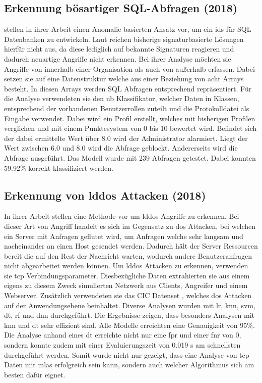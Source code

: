 \documentclass[
    12pt, %
    DIV10,
    ngerman, %
    a4paper, %
    oneside, %
    titlepage, %
    parskip=half, %
    headings=normal, %
    listof=totoc, %
    bibliography=totoc, %
    index=totoc, %
    captions=tableheading, %
    final %
]{scrreprt}
\begin{document}
\subsection{Erkennung bösartiger SQL-Abfragen (2018)}
\textcite{Jayaprakash2018} stellen in ihrer Arbeit einen Anomalie basierten Ansatz vor, um ein \ac{ids} für SQL Datenbanken zu entwickeln. Laut \textcite{Jayaprakash2018} reichen bisherige signaturbasierte Lösungen hierfür nicht aus, da diese lediglich auf bekannte Signaturen reagieren und dadurch neuartige Angriffe nicht erkennen. Bei ihrer Analyse möchten sie Angriffe von innerhalb einer Organisation als auch von au{\ss}erhalb erfassen. Dabei setzen sie auf eine Datenstruktur welche aus einer Beziehung von acht Arrays besteht. In diesen Arrays werden SQL Abfragen entsprechend repräsentiert. Für die Analyse verwendeten sie den \acl{nb} Klassifikator, welcher Daten in Klassen, entsprechend der vorhandenen Benutzerrollen zuteilt und die Protokolldatei als Eingabe verwendet. Dabei wird ein Profil erstellt, welches mit bisherigen Profilen verglichen und mit einem Punktesystem von 0 bis 10 bewertet wird. Befindet sich der dabei ermittelte Wert über 8.0 wird der Administrator alarmiert. Liegt der Wert zwischen 6.0 und 8.0 wird die Abfrage geblockt. Andererseits wird die Abfrage ausgeführt. Das Modell wurde mit 239 Abfragen getestet. Dabei konnten 59.92\% korrekt klassifiziert werden.
%
\subsection{Erkennung von \acs{lddos} Attacken (2018)}\label{cic}
In ihrer Arbeit stellen \textcite{siracusano2018detection} eine Methode vor um \ac{lddos} Angriffe zu erkennen. Bei dieser Art von Angriff handelt es sich im Gegensatz zu \ac{dos} Attacken, bei welchen ein Server mit Anfragen geflutet wird, um Anfragen welche sehr langsam und nacheinander an einen Host gesendet werden. Dadurch hält der Server Ressourcen bereit die auf den Rest der Nachricht warten, wodurch andere Benutzeranfragen nicht abgearbeitet werden können. Um \ac{lddos} Attacken zu erkennen, verwenden sie \ac{tcp} Verbindungsparameter. Diesbezügliche Daten extrahierten sie aus einem eigens zu diesem Zweck simulierten Netzwerk aus Clients, Angreifer und einem Webserver. Zusätzlich verwendeten sie das CIC Datenset \parencite{jazi2017detecting}, welches \ac{dos} Attacken auf der Anwendungsebene beinhaltet.
Diverse Analysen wurden mit \ac{lr}, \ac{knn}, \ac{svm}, \ac{dt}, \ac{rf} und \ac{dnn} durchgeführt. Die Ergebnisse zeigen, dass besonders Analysen mit \ac{knn} und \ac{dt} sehr effizient sind. Alle Modelle erreichten eine Genauigkeit von 95\%. Die Analyse anhand eines \acl{dt} erreichte nicht nur eine \ac{fpr} und einer \ac{fnr} von 0, sondern konnte zudem mit einer Evaluierungszeit von 0.019 s am schnellsten durchgeführt werden. Somit wurde nicht nur gezeigt, dass eine Analyse von \ac{tcp} Daten mit \ac{mlas} erfolgreich sein kann, sondern auch welcher Algorithmus sich am besten dafür eignet.
%
\end{document}
